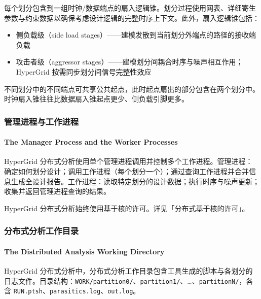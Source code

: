 
每个划分包含到一组时钟/数据端点的扇入逻辑锥。划分过程使用网表、详细寄生参数与约束数据以确保考虑设计逻辑的完整时序上下文。此外，扇入逻辑锥包括：
\begin{itemize}
  \item 侧负载级（side load stages）——建模发散到当前划分外端点的路径的接收端负载
  \item 攻击者级（aggressor stages）——建模划分间耦合时序与噪声相互作用；HyperGrid 按需同步划分间信号完整性效应
\end{itemize}

不同划分中的不同端点可共享公共起点，此时起点扇出的部分包含在两个划分中。时钟扇入锥往往比数据扇入锥起点更少、侧负载引脚更多。

\subsubsection{管理进程与工作进程}
\paragraph*{The Manager Process and the Worker Processes}

HyperGrid 分布式分析使用单个管理进程调用并控制多个工作进程。管理进程：确定如何划分设计；调用工作进程（每个划分一个）；通过查询工作进程并合并信息生成全设计报告。工作进程：读取特定划分的设计数据；执行时序与噪声更新；收集并返回管理进程查询的结果。


HyperGrid 分布式分析始终使用基于核的许可。详见「分布式基于核的许可」。

\subsubsection{分布式分析工作目录}
\paragraph*{The Distributed Analysis Working Directory}

HyperGrid 分布式分析中，分布式分析工作目录包含工具生成的脚本与各划分的日志文件。目录结构：\texttt{WORK/partition0/}、\texttt{partition1/}、\ldots、\texttt{partitionN/}，各含 \texttt{RUN.ptsh}、\texttt{parasitics.log}、\texttt{out.log}。

